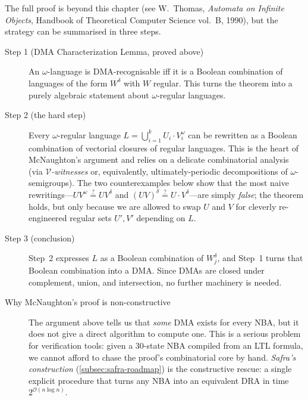 \begin{formaldetails}
The full proof is beyond this chapter (see W.~Thomas, \textit{Automata on Infinite Objects}, Handbook of Theoretical Computer Science vol.~B, 1990), but the strategy can be summarised in three steps.

\begin{description}
    \item[Step 1 (DMA Characterization Lemma, proved above)] An $\omega$-language is DMA-recognisable iff it is a Boolean combination of languages of the form $W^\delta$ with $W$ regular. This turns the theorem into a purely algebraic statement about $\omega$-regular languages.

    \item[Step 2 (the hard step)] Every $\omega$-regular language $L = \bigcup_{i=1}^k U_i \cdot V_i^\omega$ can be rewritten as a Boolean combination of vectorial closures of regular languages. This is the heart of McNaughton's argument and relies on a delicate combinatorial analysis (via \emph{$\mathcal{V}$-witnesses} or, equivalently, ultimately-periodic decompositions of $\omega$-semigroups). The two counterexamples below show that the most naive rewritings---$U V^\omega \stackrel{?}{=} U V^\delta$ and $(UV)^\delta \stackrel{?}{=} U \cdot V^\delta$---are simply \emph{false}; the theorem holds, but only because we are allowed to swap $U$ and $V$ for cleverly re-engineered regular sets $U', V'$ depending on $L$.

    \item[Step 3 (conclusion)] Step~2 expresses $L$ as a Boolean combination of $W_j^\delta$, and Step~1 turns that Boolean combination into a DMA. Since DMAs are closed under complement, union, and intersection, no further machinery is needed.

    \item[Why McNaughton's proof is non-constructive] The argument above tells us that \emph{some} DMA exists for every NBA, but it does not give a direct algorithm to compute one. This is a serious problem for verification tools: given a 30-state NBA compiled from an LTL formula, we cannot afford to chase the proof's combinatorial core by hand. \emph{Safra's construction} (\cref{subsec:safra-roadmap}) is the constructive rescue: a single explicit procedure that turns any NBA into an equivalent DRA in time $2^{\mathcal{O}(n \log n)}$.
\end{description}
\end{formaldetails}

